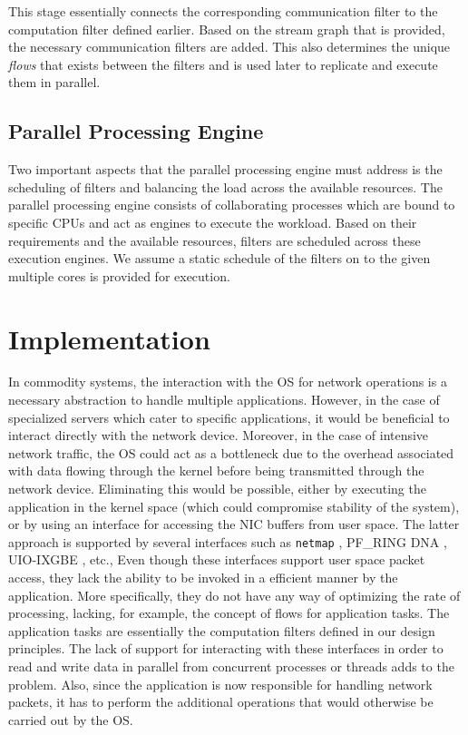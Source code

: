 \documentclass[10pt, conference, compsocconf, reqno]{IEEEtran}
\newcommand{\comment}[1]{}
\begin{document}
This stage essentially connects the corresponding communication filter to the computation filter defined earlier. Based on the stream graph that is provided, the necessary communication filters are added. This also determines the unique \textit{flows} that exists between the filters and is used later to replicate and execute them in parallel.

\subsection{Parallel Processing Engine}

Two important aspects that the parallel processing engine must address is the scheduling of filters and balancing the load across the available resources. The parallel processing engine consists of collaborating processes which are bound to specific CPUs and act as engines to execute the workload. Based on their requirements and the available resources, filters are scheduled across these execution engines. We assume a static schedule of the filters on to the given multiple cores is provided for execution. \comment{In this manner, the workload can be distributed flexibly.}

\section{Implementation}
\label{imple}

\comment{Most extant stream applications depend on the OS for their communication tasks.}In commodity systems, the interaction with the OS for network operations is a necessary abstraction to handle multiple applications. However, in the case of specialized servers which cater to specific applications, it would be beneficial to interact directly with the network device. Moreover, in the case of intensive network traffic, the OS could act as a bottleneck due to the overhead associated with data flowing through the kernel before being transmitted through the network device\cite{Wu:2007:PPB:1323954.1323957}\cite{Wu:2007:PAL:1227865.1228021}. Eliminating this would be possible, either by executing the application in the kernel space (which could compromise stability of the system), or by using an interface for accessing the NIC buffers from user space. The latter approach is supported by several interfaces such as \texttt{netmap} \cite{Rizzo:2012:RNI:2090147.2103536}, PF\_RING DNA \cite{1564468}, UIO-IXGBE \cite{Krasnyansky}, etc., Even though these interfaces support user space packet access, they lack the ability to be invoked in a efficient manner by the application. More specifically, they do not have any way of optimizing the rate of processing, lacking, for example, the concept of flows for application tasks. The application tasks are essentially the computation filters defined in our design principles. The lack of support for interacting with these interfaces in order to read and write data in parallel from concurrent processes or threads adds to the problem. Also, since the application is now responsible for handling network packets, it has to perform the additional operations that would otherwise be carried out by the OS.
\end{document}
